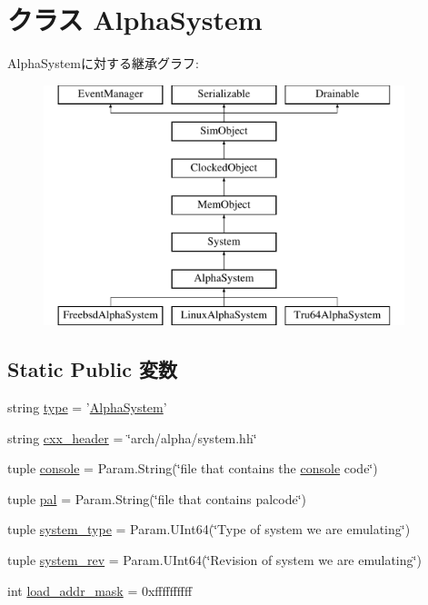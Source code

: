 \hypertarget{classAlphaSystem_1_1AlphaSystem}{
\section{クラス AlphaSystem}
\label{classAlphaSystem_1_1AlphaSystem}
}
AlphaSystemに対する継承グラフ:\begin{figure}[H]
\begin{center}
\leavevmode
\includegraphics[height=7cm]{classAlphaSystem_1_1AlphaSystem}
\end{center}
\end{figure}
\subsection*{Static Public 変数}
\begin{DoxyCompactItemize}
\item 
string \hyperlink{classAlphaSystem_1_1AlphaSystem_acce15679d830831b0bbe8ebc2a60b2ca}{type} = '\hyperlink{classAlphaSystem_1_1AlphaSystem}{AlphaSystem}'
\item 
string \hyperlink{classAlphaSystem_1_1AlphaSystem_a17da7064bc5c518791f0c891eff05fda}{cxx\_\-header} = \char`\"{}arch/alpha/system.hh\char`\"{}
\item 
tuple \hyperlink{classAlphaSystem_1_1AlphaSystem_a9359679c7dbb7d6922387b94caf2c292}{console} = Param.String(\char`\"{}file that contains the \hyperlink{classAlphaSystem_ac1fd76adeba49aea2ab70e0cba58d9d0}{console} code\char`\"{})
\item 
tuple \hyperlink{classAlphaSystem_1_1AlphaSystem_a7fa215a0a8f10398c16257e0c8534514}{pal} = Param.String(\char`\"{}file that contains palcode\char`\"{})
\item 
tuple \hyperlink{classAlphaSystem_1_1AlphaSystem_af401252d15d9cecde29d1fdcbaba250d}{system\_\-type} = Param.UInt64(\char`\"{}Type of system we are emulating\char`\"{})
\item 
tuple \hyperlink{classAlphaSystem_1_1AlphaSystem_a0f86e3835b8bf2135faf7b1bab968494}{system\_\-rev} = Param.UInt64(\char`\"{}Revision of system we are emulating\char`\"{})
\item 
int \hyperlink{classAlphaSystem_1_1AlphaSystem_abd9c5cc6b7da624a69344d571bab1038}{load\_\-addr\_\-mask} = 0xffffffffff
\end{DoxyCompactItemize}


